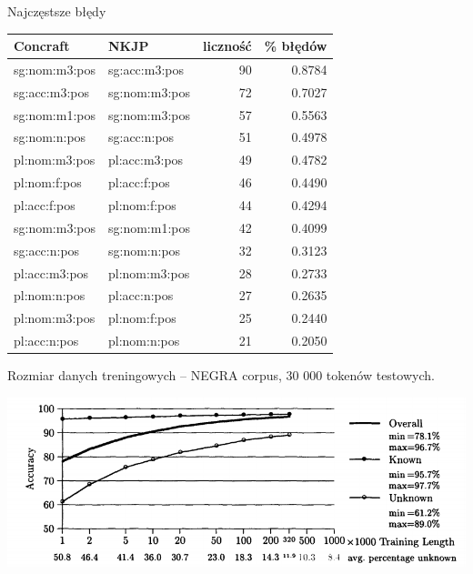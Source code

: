 \documentclass[xcolor=dvipsnames,polish]{beamer}
\begin{document}
\begin{frame}{Najczęstsze błędy}
  \begin{center}
  \begin{tabular}{llrr}
    Concraft & NKJP & liczność & \% błędów \\ \hline
    sg:nom:m3:pos & sg:acc:m3:pos & 90 & 0.8784 \\
    sg:acc:m3:pos & sg:nom:m3:pos & 72 & 0.7027 \\
    sg:nom:m1:pos & sg:nom:m3:pos & 57 & 0.5563 \\
    sg:nom:n:pos & sg:acc:n:pos & 51 & 0.4978 \\
    pl:nom:m3:pos & pl:acc:m3:pos & 49 & 0.4782 \\
    pl:nom:f:pos & pl:acc:f:pos & 46 & 0.4490 \\
    pl:acc:f:pos & pl:nom:f:pos & 44 & 0.4294 \\
    sg:nom:m3:pos & sg:nom:m1:pos & 42 & 0.4099 \\
    sg:acc:n:pos & sg:nom:n:pos & 32 & 0.3123 \\
    pl:acc:m3:pos & pl:nom:m3:pos & 28 & 0.2733 \\
    pl:nom:n:pos & pl:acc:n:pos & 27 & 0.2635 \\
    pl:nom:m3:pos & pl:nom:f:pos & 25 & 0.2440 \\
    pl:acc:n:pos & pl:nom:n:pos & 21 & 0.2050 \\
  \end{tabular}
  \end{center}
\end{frame}

\begin{frame}{Rozmiar danych treningowych}
   -- NEGRA corpus, 30 000 tokenów testowych.
  \begin{center}
    \includegraphics[width=\textwidth]{img/tnt_lcurve.png}
  \end{center}
\end{frame}
\end{document}

